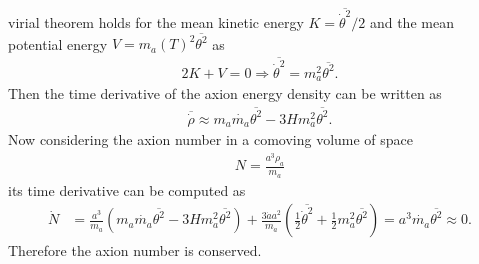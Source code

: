 \documentclass[a4paper, 12pt]{article}
\begin{document}
virial theorem holds for the mean kinetic energy $K = \overline{\dot{\theta}^2} / 2$ and the mean potential energy $V = m_a(T)^2 \overline{\theta^2}$ as
\begin{align*}
    2K + V = 0 \Rightarrow \overline{\dot{\theta}^2} = m_a^2 \overline{\theta^2}.
\end{align*}
Then the time derivative of the axion energy density can be written as
\begin{align*}
    \overline{\dot{\rho}} \approx m_a \dot{m_a} \overline{\theta^2} - 3 H m_a^2 \overline{\theta^2}.
\end{align*}
Now considering the axion number in a comoving volume of space
\begin{align*}
    N = \frac{a^3 \rho_a}{m_a}
\end{align*}
its time derivative can be computed as
\begin{align*}
    \dot{N} &= \frac{a^3}{m_a} (m_a \dot{m_a} \overline{\theta^2} - 3 H m_a^2 \overline{\theta^2}) + \frac{3 \dot{a} a^2}{m_a} \left( \frac{1}{2} \overline{\dot{\theta}^2} + \frac{1}{2} m_a^2 \overline{\theta^2} \right)
    = a^3 \dot{m_a} \overline{\theta^2} \approx 0.
\end{align*}
Therefore the axion number is conserved.
\end{document}
